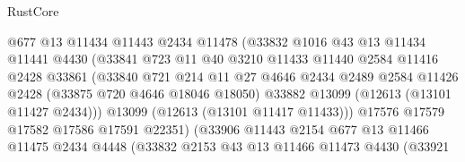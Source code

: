 \begin{lexlean}{RustCore}
\begin{coremodule}
                              @677
                              @13
                              @11434
                              @11443
                              @2434
                              @11478
                              (@33832
                                @1016
                                @43
                                @13
                                @11434
                                @11441
                                @4430
                                (@33841
                                  @723
                                  @11
                                  @40
                                  @3210
                                  @11433
                                  @11440
                                  @2584
                                  @11416
                                  @2428
                                  @33861
                                  (@33840
                                    @721
                                    @214
                                    @11
                                    @27
                                    @4646
                                    @2434
                                    @2489
                                    @2584
                                    @11426
                                    @2428
                                    (@33875 @720 @4646 @18046 @18050)
                                    @33882
                                    @13099
                                    (@12613 (@13101 @11427 @2434)))
                                  @13099
                                  (@12613 (@13101 @11417 @11433)))
                                @17576
                                @17579
                                @17582
                                @17586
                                @17591
                                @22351)
                              (@33906
                                @11443
                                @2154
                                @677
                                @13
                                @11466
                                @11475
                                @2434
                                @4448
                                (@33832
                                  @2153
                                  @43
                                  @13
                                  @11466
                                  @11473
                                  @4430
                                  (@33921

\end{coremodule}
\end{lexlean}
